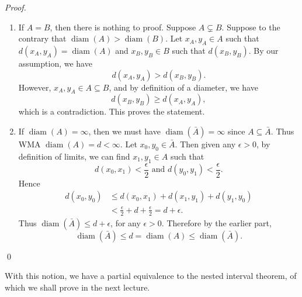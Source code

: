 \documentclass[notoc,notitlepage]{tufte-book}
\DeclareMathOperator{\diam}{diam }
\begin{document}
\begin{proof}
  \begin{enumerate}
    \item If $A = B$, then there is nothing to proof. Suppose $A \subsetneq B$. Suppose to the contrary that $\diam(A) > \diam(B)$. Let $x_A, y_A \in A$ such that $d(x_A, y_A) = \diam(A)$ and $x_B, y_B \in B$ such that $d(x_B, y_B)$. By our assumption, we have
      \begin{equation*}
        d(x_A, y_A) > d(x_B, y_B).
      \end{equation*}
      However, $x_A, y_A \in A \subseteq B$, and by definition of a diameter, we have
      \begin{equation*}
        d(x_B, y_B) \geq d(x_A, y_A),
      \end{equation*}
      which is a contradiction. This proves the statement.
    \item If $\diam(A) = \infty$, then we must have $\diam(\bar{A}) = \infty$ since $A \subseteq \bar{A}$. Thus WMA $\diam(A) = d < \infty$. Let $x_0, y_0 \in \bar{A}$. Then given any $\epsilon > 0$, by definition of limits, we can find $x_1, y_1 \in A$ such that
      \begin{equation*}
        d(x_0, x_1) < \frac{\epsilon}{2} \text{ and } d(y_0, y_1) < \frac{\epsilon}{2}.
      \end{equation*}
      Hence
      \begin{align*}
        d(x_0, y_0) &\leq d(x_0, x_1) + d(x_1, y_1) + d(y_1, y_0) \\
                    &< \frac{\epsilon}{2} + d + \frac{\epsilon}{2} = d + \epsilon.
      \end{align*}
      Thus $\diam(\bar{A}) \leq d + \epsilon$, for any $\epsilon > 0$. Therefore by the earlier part,
      \begin{equation*}
        \diam(\bar{A}) \leq d = \diam(A) \leq \diam(\bar{A}).
      \end{equation*}
  \end{enumerate}\qed\
\end{proof}

With this notion, we have a partial equivalence to the nested interval theorem, of which we shall prove in the next lecture.



\end{document}
